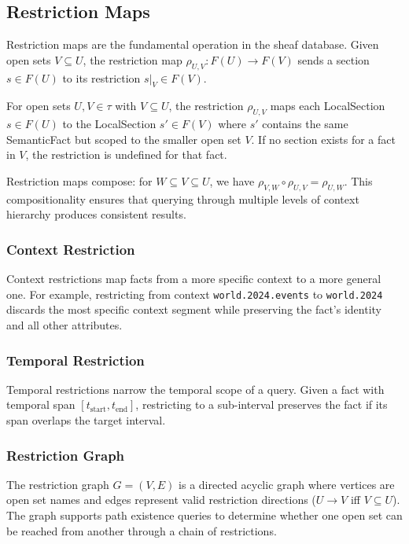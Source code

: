 
\subsection{Restriction Maps}

Restriction maps are the fundamental operation in the sheaf database. Given open sets $V \subseteq U$, the restriction map $\rho_{U,V}: F(U) \to F(V)$ sends a section $s \in F(U)$ to its restriction $s|_V \in F(V)$.

\begin{definition}
For open sets $U, V \in \tau$ with $V \subseteq U$, the restriction $\rho_{U,V}$ maps each LocalSection $s \in F(U)$ to the LocalSection $s' \in F(V)$ where $s'$ contains the same SemanticFact but scoped to the smaller open set $V$. If no section exists for a fact in $V$, the restriction is undefined for that fact.
\end{definition}

Restriction maps compose: for $W \subseteq V \subseteq U$, we have $\rho_{V,W} \circ \rho_{U,V} = \rho_{U,W}$. This compositionality ensures that querying through multiple levels of context hierarchy produces consistent results.

\subsubsection{Context Restriction}

Context restrictions map facts from a more specific context to a more general one. For example, restricting from context \texttt{world.2024.events} to \texttt{world.2024} discards the most specific context segment while preserving the fact's identity and all other attributes.

\subsubsection{Temporal Restriction}

Temporal restrictions narrow the temporal scope of a query. Given a fact with temporal span $[t_{\text{start}}, t_{\text{end}}]$, restricting to a sub-interval preserves the fact if its span overlaps the target interval.

\subsubsection{Restriction Graph}

The restriction graph $G = (V, E)$ is a directed acyclic graph where vertices are open set names and edges represent valid restriction directions ($U \to V$ iff $V \subseteq U$). The graph supports path existence queries to determine whether one open set can be reached from another through a chain of restrictions.
\endinput

